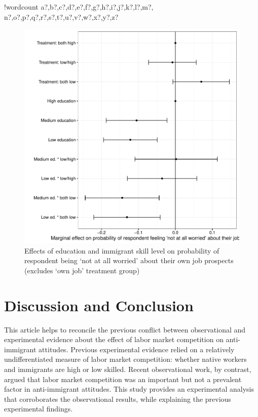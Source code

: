 \documentclass{article}\usepackage[]{graphicx}\usepackage[]{color}
\makeatletter
\def\maxwidth{ %
  \ifdim\Gin@nat@width>\linewidth
    \linewidth
  \else
    \Gin@nat@width
  \fi
}
\newcounter{words}
\newenvironment{counted}{%
\setcounter{words}{0}
\SearchList!{wordcount}{\stepcounter{words}}
{a?,b?,c?,d?,e?,f?,g?,h?,i?,j?,k?,l?,m?,
n?,o?,p?,q?,r?,s?,t?,u?,v?,w?,x?,y?,z?}
\UndoBoundary{'}
\SearchOrder{p;}}{%
\StopSearching}
\makeatother
\begin{document}
\begin{counted}
\begin{figure}
\includegraphics[width=\maxwidth]{figure/manipCheckCompete-1} \caption[Effects of education and immigrant skill level on probability of respondent being `not at all worried' about their own job prospects (excludes `own job' treatment group)]{Effects of education and immigrant skill level on probability of respondent being `not at all worried' about their own job prospects (excludes `own job' treatment group)}\label{fig:manipCheckCompete}
\end{figure}




\section{Discussion and Conclusion}

This article helps to reconcile the previous conflict between observational and experimental evidence about the effect of labor market competition on anti-immigrant attitudes. Previous experimental evidence relied on a relatively undifferentiated measure of labor market competition: whether native workers and immigrants are high or low skilled. Recent observational work, by contrast, argued that labor market competition was an important but not a prevalent factor in anti-immigrant attitudes. This study provides an experimental analysis that corroborates the observational results, while explaining the previous experimental findings. 


\end{counted}
\end{document}
